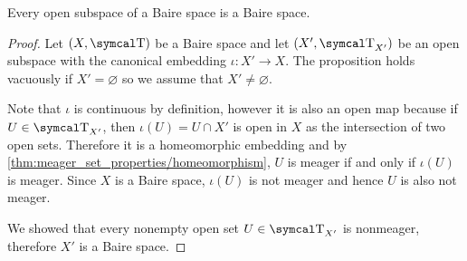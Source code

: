 \begin{proposition}\label{thm:open_subspace_of_baire_space_is_baire}
  Every open subspace of a Baire space is a Baire space.
\end{proposition}
\begin{proof}
  Let \( (X, \CT) \) be a Baire space and let \( (X', \CT_{X'}) \) be an open subspace with the canonical embedding \( \iota: X' \to X \). The proposition holds vacuously if \( X' = \varnothing \) so we assume that \( X' \neq \varnothing \).

  Note that \( \iota \) is continuous by definition, however it is also an open map because if \( U \in \CT_{X'} \), then \( \iota(U) = U \cap X' \) is open in \( X \) as the intersection of two open sets. Therefore it is a homeomorphic embedding and by \cref{thm:meager_set_properties/homeomorphism}, \( U \) is meager if and only if \( \iota(U) \) is meager. Since \( X \) is a Baire space, \( \iota(U) \) is not meager and hence \( U \) is also not meager.

  We showed that every nonempty open set \( U \in \CT_{X'} \) is nonmeager, therefore \( X' \) is a Baire space.
\end{proof}
